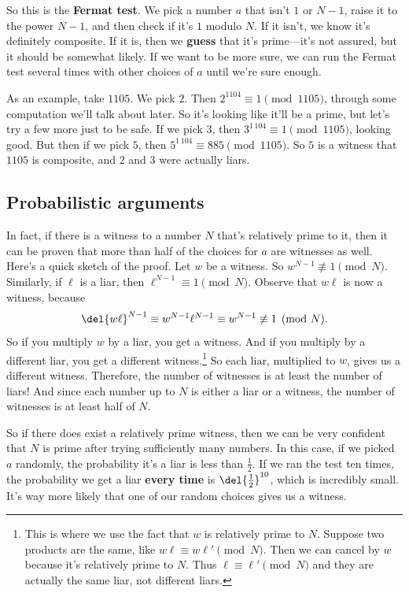 \documentclass[11pt,paper=letter]{scrartcl}
\begin{document}
So this is the \textbf{Fermat test}. We pick a number $a$ that isn't $1$ or $N-1$, raise it to the power $N - 1$, and then check if it's $1$ modulo $N$. If it isn't, we know it's definitely composite. If it is, then we \textbf{guess} that it's prime---it's not assured, but it should be somewhat likely. If we want to be more sure, we can run the Fermat test several times with other choices of $a$ until we're sure enough.

As an example, take $1105$. We pick $2$. Then $2^{1104} \equiv 1 \pmod{1105}$, through some computation we'll talk about later. So it's looking like it'll be a prime, but let's try a few more just to be safe. If we pick $3$, then $3^{1\,104} \equiv 1 \pmod{1105}$, looking good. But then if we pick $5$, then $5^{1\,104} \equiv 885 \pmod{1105}$. So $5$ is a witness that $1105$ is composite, and $2$ and $3$ were actually liars.

\subsection{Probabilistic arguments}

In fact, if there is a witness to a number $N$ that's relatively prime to it, then it can be proven that more than half of the choices for $a$ are witnesses as well. Here's a quick sketch of the proof. Let $w$ be a witness. So $w^{N-1} \not \equiv 1 \pmod{N}$. Similarly, if $\ell$ is a liar, then $\ell^{N-1} \equiv 1 \pmod{N}$. Observe that $w\ell$ is now a witness, because
$$\del{w\ell}^{N-1} \equiv w^{N-1} \ell^{N-1} \equiv w^{N-1} \not\equiv 1 \pmod{N}.$$
So if you multiply $w$ by a liar, you get a witness. And if you multiply by a different liar, you get a different witness.\footnote{This is where we use the fact that $w$ is relatively prime to $N$. Suppose two products are the same, like $w\ell \equiv w\ell' \pmod N$. Then we can cancel by $w$ because it's relatively prime to $N$. Thus $\ell \equiv \ell' \pmod N$ and they are actually the same liar, not different liars.} So each liar, multiplied to $w$, gives us a different witness. Therefore, the number of witnesses is at least the number of liars! And since each number up to $N$ is either a liar or a witness, the number of witnesses is at least half of $N$.

So if there does exist a relatively prime witness, then we can be very confident that $N$ is prime after trying sufficiently many numbers. In this case, if we picked $a$ randomly, the probability it's a liar is less than $\frac12$. If we ran the test ten times, the probability we get a liar \textbf{every time} is $\del{\frac12}^{10}$, which is incredibly small. It's way more likely that one of our random choices gives us a witness.
\end{document}
